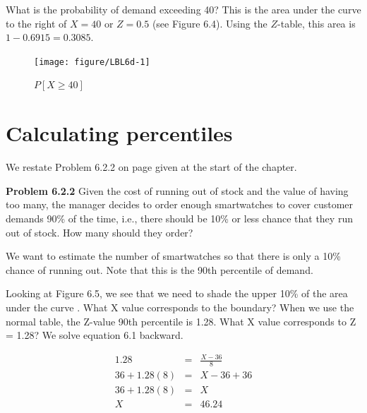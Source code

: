 \documentclass[11pt, chapterprefix=true]{scrbook}\usepackage[]{graphicx}\usepackage[]{color}
\begin{document}
What is the probability of demand exceeding 40?  This is the area under the curve to the right of $X = 40$ or $Z = 0.5$ (see Figure 6.4).  Using the $Z$-table, this area is $1 -  0.6915 = 0.3085$.

\begin{figure}[ht]

\caption{$P[ X \ge 40 ]$ }





{\centering \texttt{[image: figure/LBL6d-1]} 

}




\end{figure}

\section{Calculating percentiles}     %

We restate Problem 6.2.2 on page \pageref{LBL622} given at the start of the chapter.

\textbf{Problem 6.2.2}  Given the cost of running out of stock and the value of having too many, the manager decides to order enough smartwatches to cover customer demands 90\% of the time, i.e., there should be 10\% or less chance that they run out of stock.  How many should they order?

We want to estimate the number of smartwatches so that there is only a 10\% chance of running out.  Note that this is the 90th percentile of demand.

Looking at Figure 6.5, we see that we need to shade the upper 10\% of the area under the curve  .  What X value corresponds to the boundary?  When we use the normal table, the Z-value 90th percentile is 1.28.  What X value corresponds to Z = 1.28?  We solve equation 6.1 backward.

\begin{eqnarray*}
1.28 & = & \frac{X - 36}{8}  \\
36 + 1.28(8) & = & X-36 + 36  \\
36 + 1.28(8) & = & X  \\
X & = & 46.24 
\end{eqnarray*}
\end{document}
